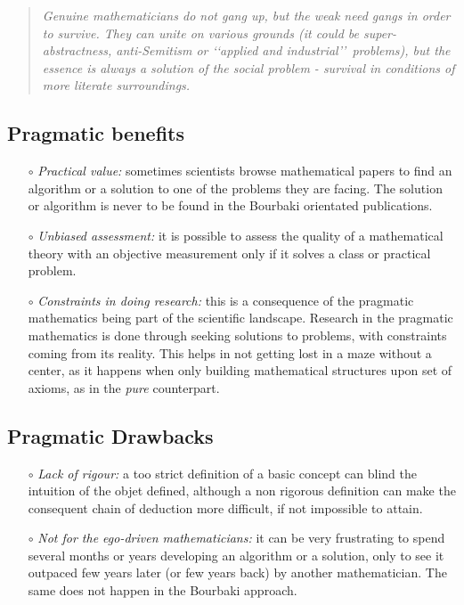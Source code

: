 \documentclass[]{scrartcl}
\theoremstyle{definition}
\begin{document}
\begin{quotation}
    \emph{Genuine mathematicians do not gang up, but the weak need gangs in order to survive. They can unite on various grounds (it could be super-abstractness, anti-Semitism or \lq\lq applied and industrial\rq\rq~problems), but the essence is always a solution of the social problem - survival in conditions of more literate surroundings.}~\cite{arnol1998teaching}
\end{quotation}

\subsection*{Pragmatic benefits}

\begin{itemize}
    \item[$\circ$] \emph{Practical value:} sometimes scientists browse mathematical papers to find an algorithm or a solution to one of the problems they are facing. The solution or algorithm is never to be found in the Bourbaki orientated publications.
    
    \item[$\circ$] \emph{Unbiased assessment:} it is possible to assess the quality of a mathematical theory with an objective measurement only if it solves a class or practical problem.
     
    \item[$\circ$] \emph{Constraints in doing research:} this is a consequence of the pragmatic mathematics being part of the scientific landscape. Research in the pragmatic mathematics is done through seeking solutions to problems, with constraints coming from its reality. This helps in not getting lost in a maze without a center, as it happens when only building mathematical structures upon set of axioms, as in the \emph{pure} counterpart.
      
\end{itemize}


\subsection*{Pragmatic Drawbacks}



\begin{itemize}
    \item[$\circ$] \emph{Lack of rigour:} a too strict definition of a basic concept can blind the intuition of the objet defined, although a non rigorous definition can make the consequent chain of deduction more difficult, if not impossible to attain.
    
    \item[$\circ$] \emph{Not for the ego-driven mathematicians:} it can be very frustrating to spend several months or years developing an algorithm or a solution, only to see it outpaced few years later (or few years back) by another mathematician. 
    The same does not happen in the Bourbaki approach.

\end{itemize}
\end{document}
